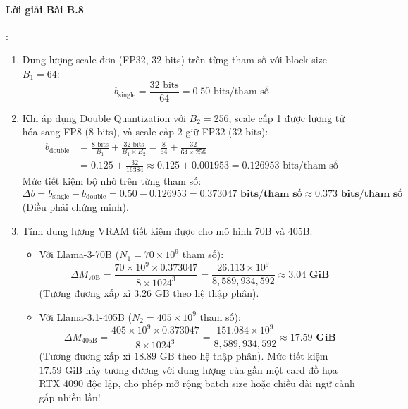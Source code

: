 \paragraph{Lời giải Bài B.8}:
\begin{enumerate}
  \item Dung lượng scale đơn (FP32, 32 bits) trên từng tham số với block size $B_1 = 64$:
  \begin{equation*}
  b_{\text{single}} = \frac{32\text{ bits}}{64} = 0.50\text{ bits/tham số}
  \end{equation*}

  \item Khi áp dụng Double Quantization với $B_2 = 256$, scale cấp 1 được lượng tử hóa sang FP8 ($8\text{ bits}$), và scale cấp 2 giữ FP32 ($32\text{ bits}$):
  \begin{align*}
  b_{\text{double}} &= \frac{8\text{ bits}}{B_1} + \frac{32\text{ bits}}{B_1 \times B_2} = \frac{8}{64} + \frac{32}{64 \times 256} \\
  &= 0.125 + \frac{32}{16384} \approx 0.125 + 0.001953 = 0.126953\text{ bits/tham số}
  \end{align*}
  Mức tiết kiệm bộ nhớ trên từng tham số:
  \begin{equation*}
  \Delta b = b_{\text{single}} - b_{\text{double}} = 0.50 - 0.126953 = \mathbf{0.373047\text{ bits/tham số}} \approx \mathbf{0.373\text{ bits/tham số}}
  \end{equation*}
  (Điều phải chứng minh).

  \item Tính dung lượng VRAM tiết kiệm được cho mô hình 70B và 405B:
  \begin{itemize}
    \item Với Llama-3-70B ($N_1 = 70 \times 10^9$ tham số):
    \begin{equation*}
    \Delta M_{\text{70B}} = \frac{70 \times 10^9 \times 0.373047}{8 \times 1024^3} = \frac{26.113 \times 10^9}{8{,}589{,}934{,}592} \approx \mathbf{3.04\text{ GiB}}
    \end{equation*}
    (Tương đương xấp xỉ $3.26\text{ GB}$ theo hệ thập phân).
    \item Với Llama-3.1-405B ($N_2 = 405 \times 10^9$ tham số):
    \begin{equation*}
    \Delta M_{\text{405B}} = \frac{405 \times 10^9 \times 0.373047}{8 \times 1024^3} = \frac{151.084 \times 10^9}{8{,}589{,}934{,}592} \approx \mathbf{17.59\text{ GiB}}
    \end{equation*}
    (Tương đương xấp xỉ $18.89\text{ GB}$ theo hệ thập phân).
    Mức tiết kiệm $17.59\text{ GiB}$ này tương đương với dung lượng của gần một card đồ họa RTX 4090 độc lập, cho phép mở rộng batch size hoặc chiều dài ngữ cảnh gấp nhiều lần!
  \end{itemize}
\end{enumerate}


